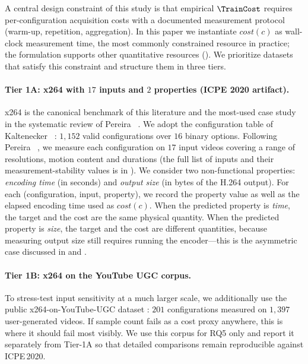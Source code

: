 A central design constraint of this study is that empirical
$\TrainCost$ requires per-configuration acquisition costs with a
documented measurement protocol (warm-up, repetition, aggregation). In
this paper we instantiate $\mathit{cost}(c)$ as wall-clock measurement
time, the most commonly constrained resource in practice; the
formulation supports other quantitative resources ().
We prioritize datasets that satisfy this constraint and structure them in
three tiers.

\paragraph*{Tier 1A: x264 with $17$ inputs and $2$ properties (ICPE 2020 artifact).}
x264 is the canonical benchmark of this literature and the most-used case
study in the systematic review of Pereira \etal~\cite{julianasurvey}. We
adopt the configuration table of Kaltenecker
\etal~\cite{kaltenecker2019}: $1{,}152$ valid configurations over $16$
binary options. Following Pereira \etal~\cite{pereira2020}, we measure each
configuration on $17$ input videos covering a range of resolutions,
motion content and durations (the full list of inputs and their
measurement-stability values is in ). We consider
two non-functional properties: \emph{encoding time} (in seconds) and
\emph{output size} (in bytes of the H.264 output). For each (configuration,
input, property), we record the property value as well as the elapsed
encoding time used as $\mathit{cost}(c)$. When the predicted
property is \emph{time}, the target and the cost are the same physical
quantity. When the predicted property is \emph{size}, the target and the
cost are different quantities, because measuring output size still requires
running the encoder---this is the asymmetric case discussed in
 and .

\paragraph*{Tier 1B: x264 on the YouTube UGC corpus.}
To stress-test input sensitivity at a much larger scale, we additionally
use the public x264-on-YouTube-UGC dataset
: $201$
configurations measured on $1{,}397$ user-generated videos. If sample count
fails as a cost proxy anywhere, this is where it should fail most
visibly. We use this corpus for RQ5 only and report it separately from
Tier-1A so that detailed comparisons remain reproducible against
ICPE\,2020.

